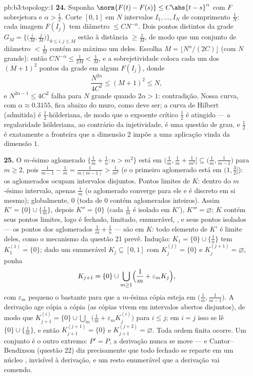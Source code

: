 \begin{solution}{pb:b3:topology:1}
\textbf{24.} Suponha $\norm{F(t) - F(s)} \leq
C\abs{t-s}^\alpha$ com $F$ sobrejetora e $\alpha >
\frac12$. Corte $[0,1]$ em $N$ intervalos $I_1, \dots, I_N$ de
comprimento $\frac1N$: cada imagem $F(I_j)$ tem diâmetro $\leq
CN^{-\alpha}$. Dois pontos distintos da grade $G_M =
\bigl\{\bigl(\frac iM, \frac jM\bigr)\bigr\}_{0 \leq i, j
\leq M}$ estão à distância $\geq \frac1M$, de modo que um conjunto de diâmetro
$< \frac1M$ contém no máximo um deles. Escolha $M =
\lfloor N^\alpha/(2C)\rfloor$ (com $N$ grande): então
$CN^{-\alpha} \leq \frac1{2M} < \frac1M$, e a sobrejetividade
coloca cada um dos $(M+1)^2$ pontos da grade em algum
$F(I_j)$, donde
\[
\frac{N^{2\alpha}}{4C^2} \leq (M + 1)^2 \leq N,
\]
e $N^{2\alpha - 1} \leq 4C^2$ falha para $N$ grande quando
$2\alpha > 1$: contradição. Nossa curva, com $\alpha \approx
0.3155$, fica abaixo do muro, como deve ser; a curva de Hilbert
(admitida) é $\frac12$-hölderiana, de modo que o expoente crítico
$\frac12$ é atingido --- a regularidade hölderiana, ao contrário da
injetividade, é uma questão de grau, e $\frac12$ é exatamente
a fronteira que a dimensão $2$ impõe a uma aplicação vinda da
dimensão $1$.

\textbf{25.} O $m$-ésimo aglomerado $\{\frac1m + \frac1n : n >
m^2\}$ está em $\bigl(\frac1m, \frac1m + \frac1{m^2}\bigr]
\subseteq \bigl(\frac1m, \frac1{m-1}\bigr)$ para $m \geq 2$,
pois $\frac1{m-1} - \frac1m = \frac1{m(m-1)} >
\frac1{m^2}$ (e o primeiro aglomerado está em $(1, \frac32]$):
os aglomerados ocupam intervalos disjuntos. Pontos limites de $K$:
dentro do $m$-ésimo intervalo, apenas $\frac1m$ (o aglomerado
converge para ele e é discreto em si mesmo); globalmente, $0$
(toda  de $0$ contém aglomerados inteiros). Assim $K'
= \{0\} \cup \{\frac1m\}$, depois $K'' = \{0\}$ (cada $\frac1m$
é isolado em $K'$), $K''' = \varnothing$; $K$ contém seus
pontos limites, logo é fechado, limitado, enumerável, ,
e seus pontos isolados --- os pontos dos aglomerados $\frac1m +
\frac1n$ --- são  em $K$: todo elemento de $K'$ é
limite deles, como o mecanismo da questão 21 prevê. Indução:
$K_1 = \{0\}\cup\{\frac1n\}$ tem $K_1^{(1)} = \{0\}$; dado
um  enumerável $K_j \subseteq [0, 1]$ com $K_j^{(j)} =
\{0\}$ e $K_j^{(j+1)} = \varnothing$, ponha
\[
K_{j+1} = \{0\} \cup \bigcup_{m \geq 1}
\Bigl(\frac1m + \varepsilon_m K_j\Bigr),
\]
com $\varepsilon_m$ pequeno o bastante para que a $m$-ésima cópia esteja
em $\bigl(\frac1m, \frac1{m-1}\bigr)$. A derivação age cópia
a cópia (as cópias vivem em intervalos abertos disjuntos), de modo que
$K_{j+1}^{(i)} = \{0\} \cup \bigcup_m\bigl(\frac1m +
\varepsilon_mK_j^{(i)}\bigr)$ para $i \leq j$; em $i = j$ isso
se lê $\{0\} \cup \{\frac1m\}$, e então $K_{j+1}^{(j+1)} =
\{0\}$ e $K_{j+1}^{(j+2)} = \varnothing$. Toda ordem finita
ocorre. Um conjunto  é o outro extremo: $P' = P$, a
derivação nunca se move --- e Cantor--Bendixson (questão
22) diz precisamente que todo fechado se reparte em um
núcleo , invisível à derivação, e um resto enumerável
que a derivação vai comendo.
\end{solution}
